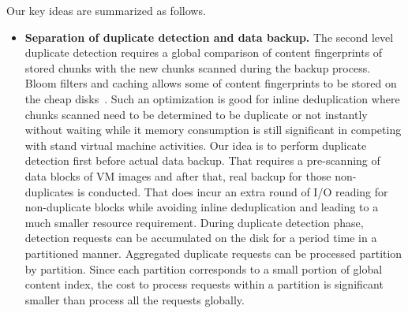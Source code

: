Our key ideas are summarized as follows.
\begin{itemize}


\item {\bf Separation of duplicate detection and data backup.}
The second level duplicate detection requires a global comparison of 
content fingerprints of stored chunks with the new chunks scanned during 
the backup process. Bloom filters and caching allows some of content 
fingerprints to be stored on the cheap disks~\cite{bottleneck08}. Such an optimization is good 
for inline deduplication where chunks scanned need to be determined to be duplicate or not instantly without 
waiting while  it memory consumption is still significant in competing with stand virtual 
machine activities.  Our idea is to perform duplicate detection first before actual data backup.
That requires a pre-scanning of  data  blocks of VM images and after that, real backup  for those non-duplicates
is conducted. That does incur an extra  round of I/O reading for non-duplicate blocks while avoiding inline 
deduplication and leading to a much smaller resource requirement. 
During duplicate detection phase, detection requests can be accumulated on the disk 
for a period time  in a  partitioned manner.  Aggregated duplicate requests can be processed partition by partition. 
Since each partition corresponds to a small portion of global content index, the cost to 
process requests within a partition is significant smaller than process all the requests globally.


\end{itemize}
